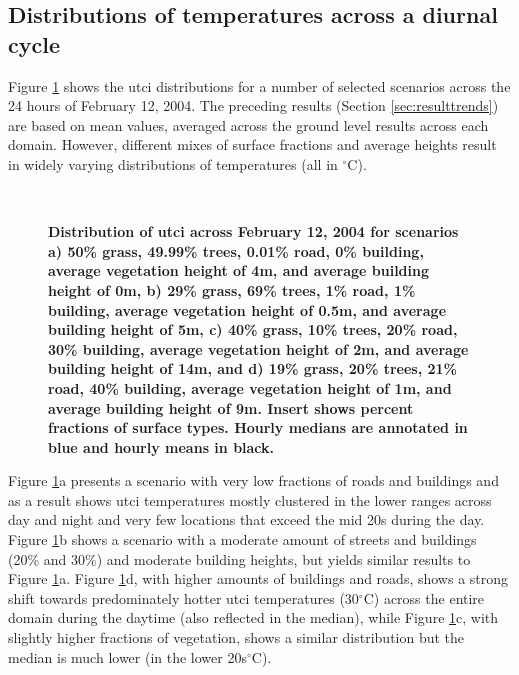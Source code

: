 \documentclass[final,3p,times,authoryear]{elsarticle}
\begin{document}
\subsection{Distributions of temperatures across a diurnal cycle}\label{sec:resultsdist}

Figure \ref{fig:dist1} shows the \gls{utci} distributions for a number of selected scenarios across the 24 hours of February 12, 2004. The preceding results (Section \ref{sec:resulttrends}) are based on mean values, averaged across the ground level results across each domain. However, different mixes of surface fractions and average heights result in widely varying distributions of temperatures (all in $^{\circ}$C). 

\begin{figure}          
\centering    
{}
\\
\caption{\bf Distribution of \gls{utci} across February 12, 2004 for scenarios a) 50\% grass, 49.99\% trees, 0.01\% road, 0\% building, average vegetation height of 4m, and average building height of 0m, b) 29\% grass, 69\% trees, 1\% road, 1\% building, average vegetation height of 0.5m, and average building height of 5m, c) 40\% grass, 10\% trees, 20\% road, 30\% building, average vegetation height of 2m, and average building height of 14m, and d) 19\% grass, 20\% trees, 21\% road, 40\% building, average vegetation height of 1m, and average building height of 9m. Insert shows percent fractions of surface types. Hourly medians are annotated in blue and hourly means in black. } \label{fig:dist1}
\end{figure} 


Figure \ref{fig:dist1}a presents a scenario with very low fractions of roads and buildings and as a result shows \gls{utci} temperatures mostly clustered in the lower ranges across day and night and very few locations that exceed the mid 20s during the day. Figure \ref{fig:dist1}b shows a scenario with a moderate amount of streets and buildings (20\% and 30\%) and moderate building heights, but yields similar results to Figure \ref{fig:dist1}a. Figure \ref{fig:dist1}d, with higher amounts of buildings and roads, shows a strong shift towards predominately hotter \gls{utci} temperatures (30$^{\circ}$C) across the entire domain during the daytime (also reflected in the median), while Figure \ref{fig:dist1}c, with slightly higher fractions of vegetation, shows a similar distribution but the median is much lower (in the lower 20s$^{\circ}$C).
\end{document}
